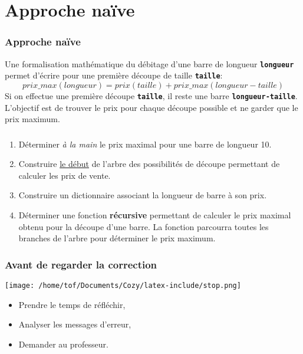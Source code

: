 \documentclass[svgnames,11pt]{beamer}
\begin{document}
\section{Approche naïve}
\begin{frame}
    \frametitle{Approche naïve}

    Une formalisation mathématique du débitage d'une barre de longueur \texttt{\textbf{longueur}} permet d'écrire pour une première découpe de taille \texttt{\textbf{taille}}:
    $$prix\_max(longueur) = prix(taille) + prix\_max(longueur-taille)$$
    Si on effectue une première découpe \texttt{\textbf{taille}}, il reste une barre \texttt{\textbf{longueur-taille}}. L'objectif est de trouver le prix pour chaque découpe possible et ne garder que le prix maximum.

\end{frame}
\begin{frame}
    \frametitle{}

    \begin{activite}
        \begin{enumerate}
            \item Déterminer \emph{à la main} le prix maximal pour une barre de longueur 10.
            \item Construire \underline{le début} de l'arbre des possibilités de découpe permettant de calculer les prix de vente.
            \item Construire un dictionnaire associant la longueur de barre à son prix.
            \item Déterminer une fonction \textbf{récursive} permettant de calculer le prix maximal obtenu pour la découpe d'une barre. La fonction parcourra toutes les branches de l'arbre pour déterminer le prix maximum.  
        \end{enumerate}
        \end{activite}

\end{frame}
\begin{frame}
    \frametitle{Avant de regarder la correction}
\begin{center}
    \centering
    \texttt{[image: /home/tof/Documents/Cozy/latex-include/stop.png]}
    \end{center}
{\Large
    \begin{itemize}
        \item Prendre le temps de réfléchir,
        \item Analyser les messages d'erreur,
        \item Demander au professeur.
    \end{itemize}
}
\end{frame}
\end{document}
